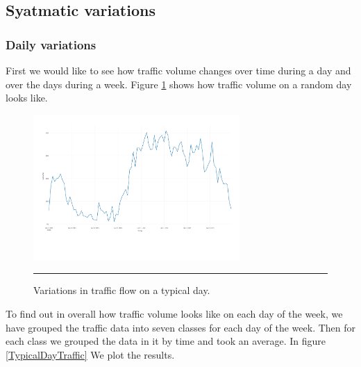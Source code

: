 \subsection{Syatmatic variations}

\subsubsection{Daily variations}
First we would like to see how traffic volume changes over time during a day and over the days during
a week. Figure \ref{fig:TypicalDay} shows how traffic volume on a random day looks like.

\begin{figure}[htbp]
  \centering
    \includegraphics[width=0.7\textwidth,height=0.7\textheight,keepaspectratio]{Figures/typical-day.pdf}
    \rule{35em}{0.5pt}
  \caption[A typical day traffic flow]{Variations in traffic flow on a typical day.}
  \label{fig:TypicalDay}
\end{figure}

To find out in overall how traffic volume looks like on each day of the week, we have grouped the
traffic data into seven classes for each day of the week. Then for each class we grouped the data
in it by time and took an average. In figure \ref{TypicalDayTraffic} We plot the results.



